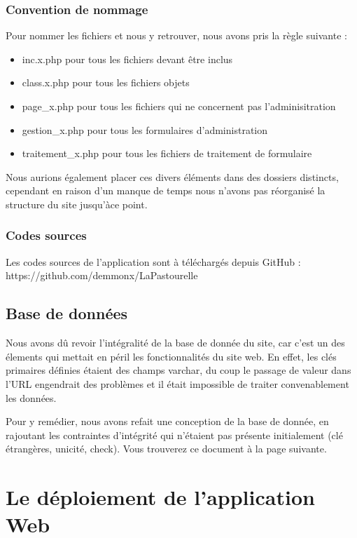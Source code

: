 \documentclass[11pt]{report}
\begin{document}
 \subsection{Convention de nommage}
 Pour nommer les fichiers et nous y retrouver, nous avons pris la règle suivante
 : 
 \begin{itemize}
   \item inc.x.php pour tous les fichiers devant être inclus
   \item class.x.php pour tous les fichiers objets
   \item page\_x.php pour tous les fichiers qui ne concernent pas
   l'adminisitration
   \item gestion\_x.php pour tous les formulaires d'administration
   \item traitement\_x.php pour tous les fichiers de traitement de formulaire \\
 \end{itemize}
 
 \par Nous aurions également placer ces divers éléments dans des dossiers
 distincts, cependant en raison d'un manque de temps nous n'avons pas réorganisé
 la structure du site jusqu'àce point.
 
 \subsection{Codes sources}
 Les codes sources de l'application sont à téléchargés depuis GitHub :
 https://github.com/demmonx/LaPastourelle

\section{Base de données}
Nous avons dû revoir l'intégralité de la base de donnée du site, car c'est un
des élements qui mettait en péril les fonctionnalités du site web. En effet, les
clés primaires définies étaient des champs varchar, du coup le passage de valeur
dans l'URL engendrait des problèmes et il était impossible de traiter
convenablement les données. \\

\par Pour y remédier, nous avons refait une conception de la base de donnée, en
rajoutant les contraintes d'intégrité qui n'étaient pas présente initialement
(clé étrangères, unicité, check). Vous trouverez ce document à la page suivante.


\chapter{Le déploiement de l'application Web}
\end{document}
